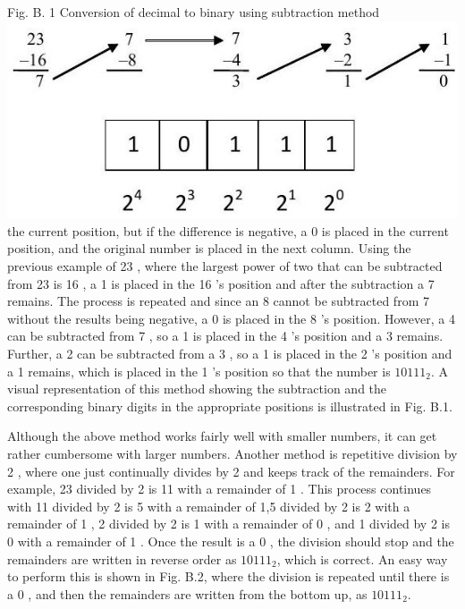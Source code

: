 \documentclass[10pt]{article}
\begin{document}
Fig. B. 1 Conversion of decimal to binary using subtraction method\\
\includegraphics[max width=\textwidth, center]{2025_03_24_ebe50cc223a6fbc49eecg-305(1)}\\
the current position, but if the difference is negative, a 0 is placed in the current position, and the original number is placed in the next column. Using the previous example of 23 , where the largest power of two that can be subtracted from 23 is 16 , a 1 is placed in the 16 's position and after the subtraction a 7 remains. The process is repeated and since an 8 cannot be subtracted from 7 without the results being negative, a 0 is placed in the 8 's position. However, a 4 can be subtracted from 7 , so a 1 is placed in the 4 's position and a 3 remains. Further, a 2 can be subtracted from a 3 , so a 1 is placed in the 2 's position and a 1 remains, which is placed in the 1 's position so that the number is $10111_{2}$. A visual representation of this method showing the subtraction and the corresponding binary digits in the appropriate positions is illustrated in Fig. B.1.

Although the above method works fairly well with smaller numbers, it can get rather cumbersome with larger numbers. Another method is repetitive division by 2 , where one just continually divides by 2 and keeps track of the remainders. For example, 23 divided by 2 is 11 with a remainder of 1 . This process continues with 11 divided by 2 is 5 with a remainder of 1,5 divided by 2 is 2 with a remainder of 1 , 2 divided by 2 is 1 with a remainder of 0 , and 1 divided by 2 is 0 with a remainder of 1 . Once the result is a 0 , the division should stop and the remainders are written in reverse order as $10111_{2}$, which is correct. An easy way to perform this is shown in Fig. B.2, where the division is repeated until there is a 0 , and then the remainders are written from the bottom up, as $10111_{2}$.
\end{document}
